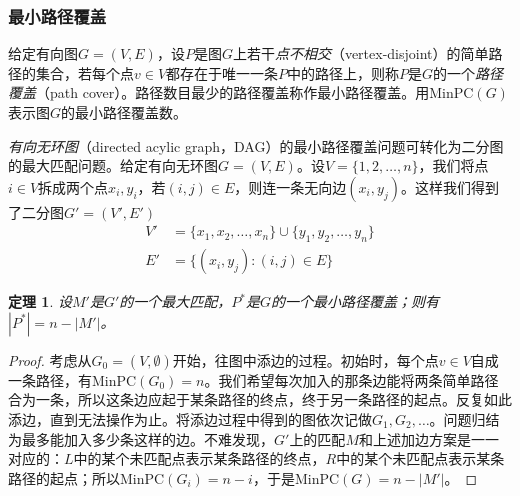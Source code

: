 \documentclass[a4paper]{ctexbook}
\newtheorem{theorem}{定理}[chapter] %
\newcommand{\mpc}{\mathrm{MinPC}}
\begin{document}
  \subsubsection*{最小路径覆盖}
  给定有向图$G=(V,E)$，设$P$是图$G$上若干\emph{点不相交}（vertex-disjoint）的简单路径的集合，若每个点$v\in V$都存在于唯一一条$P$中的路径上，则称$P$是$G$的一个\emph{路径覆盖}（path cover）。路径数目最少的路径覆盖称作最小路径覆盖。用$\mpc(G)$表示图$G$的最小路径覆盖数。

  \emph{有向无环图}（directed acylic graph，DAG）的最小路径覆盖问题可转化为二分图的最大匹配问题。给定有向无环图$G=(V,E)$。设$V=\{1,2,\dots,n\}$，我们将点$i\in V$拆成两个点$x_i, y_i$，若$(i,j)\in E$，则连一条无向边$(x_i, y_j)$。这样我们得到了二分图$G'=(V',E')$
  \begin{align*}
    V'&=\{x_1, x_2, \dots, x_n\} \cup \{y_1, y_2, \dots, y_n\}\\
    E'&=\{(x_i,y_j)\colon (i,j)\in E\}
  \end{align*}
  \begin{theorem}
    设$M'$是$G'$的一个最大匹配，$P^*$是$G$的一个最小路径覆盖；则有$|P^*|=n-|M'|$。
  \end{theorem}
  \begin{proof}
    考虑从$G_0=(V,\emptyset)$开始，往图中添边的过程。初始时，每个点$v\in V$自成一条路径，有$\mpc(G_0)=n$。我们希望每次加入的那条边能将两条简单路径合为一条，所以这条边应起于某条路径的终点，终于另一条路径的起点。反复如此添边，直到无法操作为止。将添边过程中得到的图依次记做$G_1,G_2,\dots$。问题归结为最多能加入多少条这样的边。不难发现，$G'$上的匹配$M$和上述加边方案是一一对应的：$L$中的某个未匹配点表示某条路径的终点，$R$中的某个未匹配点表示某条路径的起点；所以$\mpc(G_i)=n-i$，于是$\mpc(G)=n-|M'|$。
  \end{proof}
  \
\end{document}
